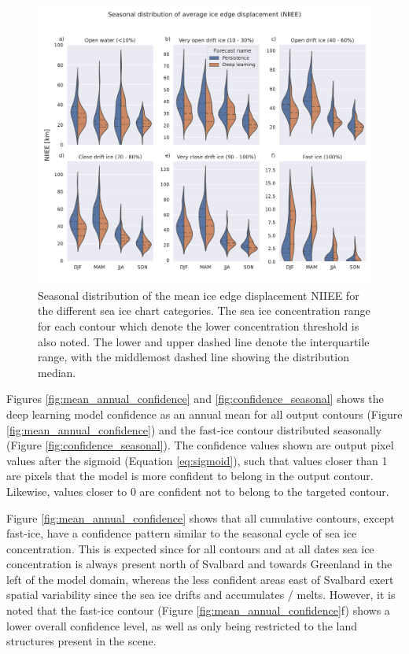 \documentclass[../main/thesis.tex]{subfiles}
\begin{document}
\begin{figure}
    \centering
    \includegraphics[width=\textwidth]{niiee}
    \caption{\label{fig:violins}Seasonal distribution of the mean ice edge displacement NIIEE for the different sea ice chart categories. The sea ice concentration range for each contour which denote the lower concentration threshold is also noted. The lower and upper dashed line denote the interquartile range, with the middlemost dashed line showing the distribution median.}
\end{figure}

Figures \ref{fig:mean_annual_confidence} and \ref{fig:confidence_seasonal} shows the deep learning model confidence as an annual mean for all output contours (Figure \ref{fig:mean_annual_confidence}) and the fast-ice contour distributed seasonally (Figure \ref{fig:confidence_seasonal}). The confidence values shown are output pixel values after the sigmoid (Equation \ref{eq:sigmoid}), such that values closer than 1 are pixels that the model is more confident to belong in the output contour. Likewise, values closer to 0 are confident not to belong to the targeted contour.

Figure \ref{fig:mean_annual_confidence} shows that all cumulative contours, except fast-ice, have a confidence pattern similar to the seasonal cycle of sea ice concentration. This is expected since for all contours and at all dates sea ice concentration is always present north of Svalbard and towards Greenland in the left of the model domain, whereas the less confident areas east of Svalbard exert spatial variability since the sea ice drifts and accumulates / melts. However, it is noted that the fast-ice contour (Figure \ref{fig:mean_annual_confidence}f) shows a lower overall confidence level, as well as only being restricted to the land structures present in the scene.
\end{document}
